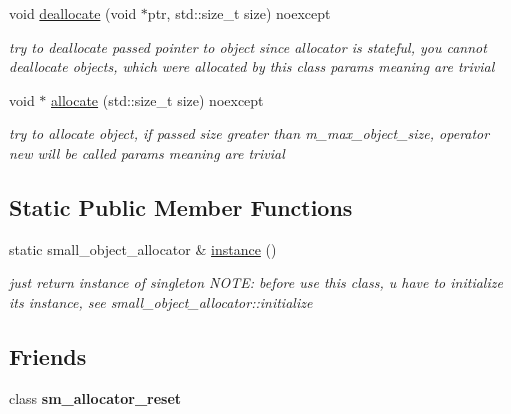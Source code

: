 \begin{CompactItemize}
\item 
\hypertarget{structhope_1_1memory_1_1final_c4a6466c5b4eca5c9251eb4406540cb6}{
void \hyperlink{structhope_1_1memory_1_1final_c4a6466c5b4eca5c9251eb4406540cb6}{deallocate} (void $\ast$ptr, std::size\_\-t size) noexcept}
\label{structhope_1_1memory_1_1final_c4a6466c5b4eca5c9251eb4406540cb6}

\begin{CompactList}\small\item\em try to deallocate passed pointer to object since allocator is stateful, you cannot deallocate objects, which were allocated by this class params meaning are trivial \item\end{CompactList}\item 
\hypertarget{structhope_1_1memory_1_1final_ddd2a53238c4a13ac22734a0ff70e594}{
void $\ast$ \hyperlink{structhope_1_1memory_1_1final_ddd2a53238c4a13ac22734a0ff70e594}{allocate} (std::size\_\-t size) noexcept}
\label{structhope_1_1memory_1_1final_ddd2a53238c4a13ac22734a0ff70e594}

\begin{CompactList}\small\item\em try to allocate object, if passed size greater than m\_\-max\_\-object\_\-size, operator new will be called params meaning are trivial \item\end{CompactList}\end{CompactItemize}
\subsection*{Static Public Member Functions}
\begin{CompactItemize}
\item 
\hypertarget{structhope_1_1memory_1_1final_60ac0028ba156818940a7c7da2ba12e1}{
static small\_\-object\_\-allocator \& \hyperlink{structhope_1_1memory_1_1final_60ac0028ba156818940a7c7da2ba12e1}{instance} ()}
\label{structhope_1_1memory_1_1final_60ac0028ba156818940a7c7da2ba12e1}

\begin{CompactList}\small\item\em just return instance of singleton NOTE: before use this class, u have to initialize its instance, see small\_\-object\_\-allocator::initialize \item\end{CompactList}\end{CompactItemize}
\subsection*{Friends}
\begin{CompactItemize}
\item 
\hypertarget{structhope_1_1memory_1_1final_430993a05a9a34af3e25581753c4d24a}{
class \textbf{sm\_\-allocator\_\-reset}}
\label{structhope_1_1memory_1_1final_430993a05a9a34af3e25581753c4d24a}

\end{CompactItemize}


